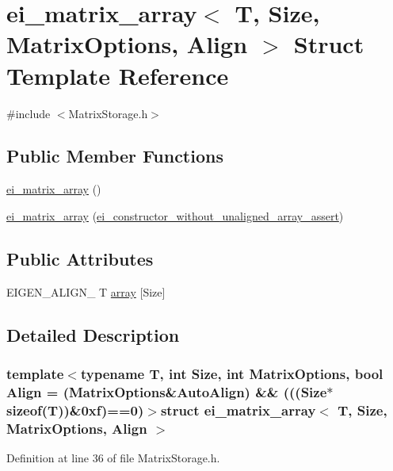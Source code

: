 \hypertarget{structei__matrix__array}{\section{ei\-\_\-matrix\-\_\-array$<$ T, Size, Matrix\-Options, Align $>$ Struct Template Reference}
\label{structei__matrix__array}
}


{\ttfamily \#include $<$Matrix\-Storage.\-h$>$}

\subsection*{Public Member Functions}
\begin{DoxyCompactItemize}
\item 
\hyperlink{structei__matrix__array_a9c2b41907fc0974e6f9527e98b5f3957}{ei\-\_\-matrix\-\_\-array} ()
\item 
\hyperlink{structei__matrix__array_a93a33d1173b7e7de9ad43076ab682734}{ei\-\_\-matrix\-\_\-array} (\hyperlink{structei__constructor__without__unaligned__array__assert}{ei\-\_\-constructor\-\_\-without\-\_\-unaligned\-\_\-array\-\_\-assert})
\end{DoxyCompactItemize}
\subsection*{Public Attributes}
\begin{DoxyCompactItemize}
\item 
E\-I\-G\-E\-N\-\_\-\-A\-L\-I\-G\-N\-\_ T \hyperlink{structei__matrix__array_abece385328c2e4f6a70bb5e7a57a759c}{array} \mbox{[}Size\mbox{]}
\end{DoxyCompactItemize}


\subsection{Detailed Description}
\subsubsection*{template$<$typename T, int Size, int Matrix\-Options, bool Align = (\-Matrix\-Options\&\-Auto\-Align) \&\& (((\-Size$\ast$sizeof(\-T))\&0xf)==0)$>$struct ei\-\_\-matrix\-\_\-array$<$ T, Size, Matrix\-Options, Align $>$}



Definition at line 36 of file Matrix\-Storage.\-h.




